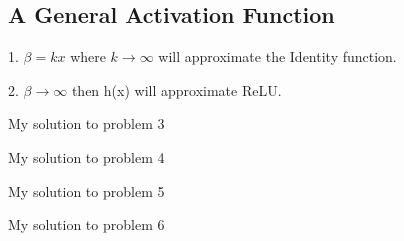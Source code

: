 \documentclass[a4paper,11pt]{article}
\begin{document}
\begin{mlsolution} 

\section{A General Activation Function}
1. $\beta = kx$ where $k \rightarrow \infty$ will approximate the Identity function.
\begin{flushleft}
2. $\beta \rightarrow \infty$ then h(x) will approximate ReLU.
\end{flushleft}


\end{mlsolution}

\begin{mlsolution}

My solution to problem 3

\end{mlsolution}

\begin{mlsolution}

My solution to problem 4

\end{mlsolution}
	
\begin{mlsolution}

My solution to problem 5

\end{mlsolution}

\begin{mlsolution}

My solution to problem 6

\end{mlsolution}
\end{document}
